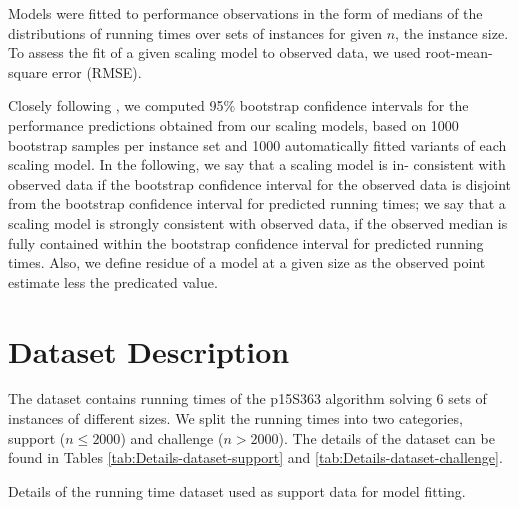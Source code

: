 Models were fitted to performance observations in the form of medians
of the distributions of running times over sets of instances for given
$n$, the instance size.
To assess the fit of a given
scaling model to observed data, we used root-mean-square error (RMSE).


Closely following \cite{hoos2009bootstrap,hoos2014empirical}, we
computed 95\% bootstrap confidence intervals for the performance predictions
obtained from our scaling models, based on 1000 bootstrap samples
per instance set and 1000 automatically fitted variants of each scaling
model.
In the following, we say that a scaling model is in-
consistent with observed data if the bootstrap confidence interval for the observed data
is disjoint from the bootstrap confidence interval for
predicted running times;
we say that a scaling model is strongly consistent with observed
data, if the observed median is fully contained
within the bootstrap confidence interval for predicted
running times.
Also, we define residue of a model at a given size as the observed
point estimate less the predicated value.

\section{Dataset Description}

The dataset contains running times of the p15S363 algorithm solving
6 sets of instances of different sizes. We split the running times into
two categories, support ($n\leq2000$) and challenge ($n>2000$). The
details of the dataset can be found in Tables \ref{tab:Details-dataset-support}
and \ref{tab:Details-dataset-challenge}.
\begin{table}
\noindent \begin{centering}

\par\end{centering}

\caption{\label{tab:Details-dataset-support} Details of the running time dataset used as support data for model fitting.}
\end{table}

